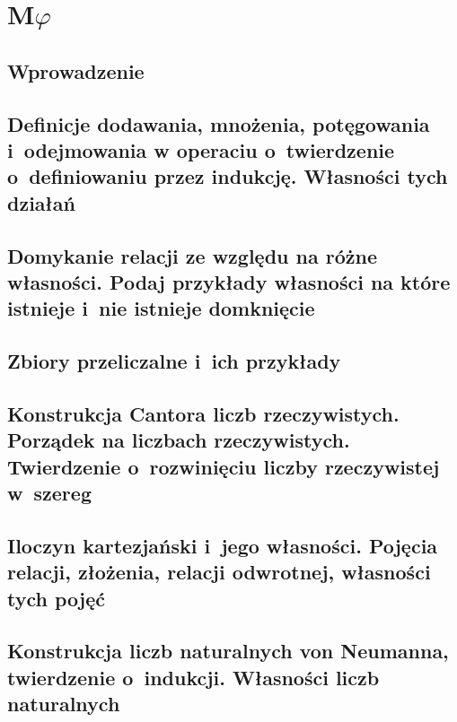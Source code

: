 \chapter{\texorpdfstring{M\(\varphi\)}{MFI}}


\section*{Wprowadzenie}


\section{Definicje dodawania, mnożenia, potęgowania i~odejmowania w operaciu o~twierdzenie o~definiowaniu przez indukcję. Własności tych działań}


\section{Domykanie relacji ze względu na różne własności. Podaj przykłady własności na które istnieje i~nie istnieje domknięcie}

\section{Zbiory przeliczalne i~ich przykłady}

\section{Konstrukcja Cantora liczb rzeczywistych. Porządek na liczbach rzeczywistych. Twierdzenie o~rozwinięciu liczby rzeczywistej w~szereg}

\section{Iloczyn kartezjański i~jego własności. Pojęcia relacji, złożenia, relacji odwrotnej, własności tych pojęć}
\label{mfi:cartesian_and_relations}


\section{Konstrukcja liczb naturalnych von Neumanna, twierdzenie o~indukcji. Własności liczb naturalnych}
\label{mfi:nat_and_induction}


